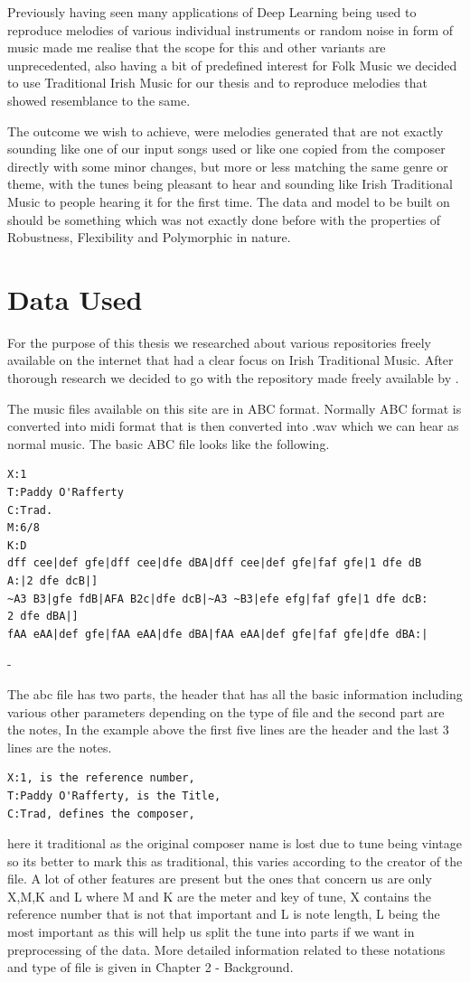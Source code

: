 \documentclass[oneside,12pt]{Classes/RoboticsLaTeX}
\begin{document}
Previously having seen many applications of Deep Learning being used to reproduce melodies of various individual instruments or random noise in form of music made me realise that the scope for this and other variants are unprecedented, also having a bit of predefined interest for Folk Music we decided to use Traditional Irish Music for our thesis and to reproduce melodies that showed resemblance to the same.

The outcome we wish to achieve, were melodies generated that are not exactly sounding like one of our input songs used or like one copied from the composer directly with some minor changes, but more or less matching the same genre or theme, with the tunes being pleasant to hear and sounding like Irish Traditional Music to people hearing it for the first time. The data and model to be built on should be something which was not exactly done before with the properties of Robustness, Flexibility and Polymorphic in nature.

\section{Data Used}
For the purpose of this thesis we researched about various repositories freely available on the internet that had a clear focus on Irish Traditional Music. After thorough research we decided to go with the repository made freely available by \cite{session}.

The music files available on this site are in ABC format. Normally ABC format is converted into midi format that is then converted into .wav which we can hear as normal music. The basic ABC file looks like the following. 
\begin{verbatim}
X:1
T:Paddy O'Rafferty  
C:Trad.  
M:6/8  
K:D  
dff cee|def gfe|dff cee|dfe dBA|dff cee|def gfe|faf gfe|1 dfe dB
A:|2 dfe dcB|]  
~A3 B3|gfe fdB|AFA B2c|dfe dcB|~A3 ~B3|efe efg|faf gfe|1 dfe dcB:
2 dfe dBA|]  
fAA eAA|def gfe|fAA eAA|dfe dBA|fAA eAA|def gfe|faf gfe|dfe dBA:|
\end{verbatim}
-\cite{abcnotation}

The abc file has two parts, the header that has all the basic information including various other parameters depending on the type of file and the second part are the notes, In the example above the first five lines are the header and the last 3 lines are the notes.
\begin{verbatim}
X:1, is the reference number,
T:Paddy O'Rafferty, is the Title, 
C:Trad, defines the composer,
\end{verbatim}here it traditional as the original composer name is lost due to tune being vintage so its better to mark this as traditional, this varies according to the creator of the file.
A lot of other features are present but the ones that concern us are only X,M,K and L where M and K are the meter and key of tune, X contains the reference number that is not that important and L is note length, L being the most important as this will help us split the tune into parts if we want in preprocessing of the data.
More detailed information related to these notations and type of file is given in Chapter 2 - Background.
\end{document}
